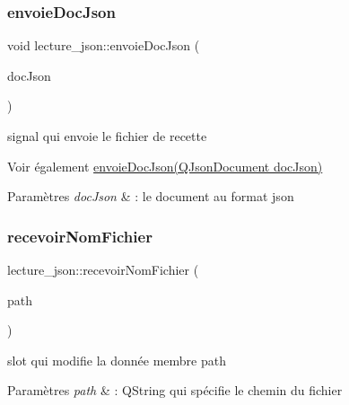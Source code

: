 \subsubsection{\texorpdfstring{envoie\+Doc\+Json}{envoieDocJson}}
{\footnotesize\ttfamily void lecture\+\_\+json\+::envoie\+Doc\+Json (\begin{DoxyParamCaption}\item[{Q\+Json\+Document}]{doc\+Json }\end{DoxyParamCaption})\hspace{0.3cm}{\ttfamily [signal]}}



signal qui envoie le fichier de recette 

\begin{DoxySeeAlso}{Voir également}
\hyperlink{classlecture__json_a62f7f4bea2c9579c37bea5b14177a5db}{envoie\+Doc\+Json(\+Q\+Json\+Document doc\+Json)} 
\end{DoxySeeAlso}

\begin{DoxyParams}{Paramètres}
{\em doc\+Json} & \+: le document au format json \\
\hline
\end{DoxyParams}
\mbox{\label{classlecture__json_a539bb092addd4ee4c75834e4ca413ee7}} 
\subsubsection{\texorpdfstring{recevoir\+Nom\+Fichier}{recevoirNomFichier}}
{\footnotesize\ttfamily lecture\+\_\+json\+::recevoir\+Nom\+Fichier (\begin{DoxyParamCaption}\item[{Q\+String}]{path }\end{DoxyParamCaption})\hspace{0.3cm}{\ttfamily [slot]}}



slot qui modifie la donnée membre path 


\begin{DoxyParams}{Paramètres}
{\em path} & \+: Q\+String qui spécifie le chemin du fichier \\
\hline
\end{DoxyParams}
\mbox{\label{classlecture__json_a88650de275287dc5ddd31f50bdd6d767}} 
